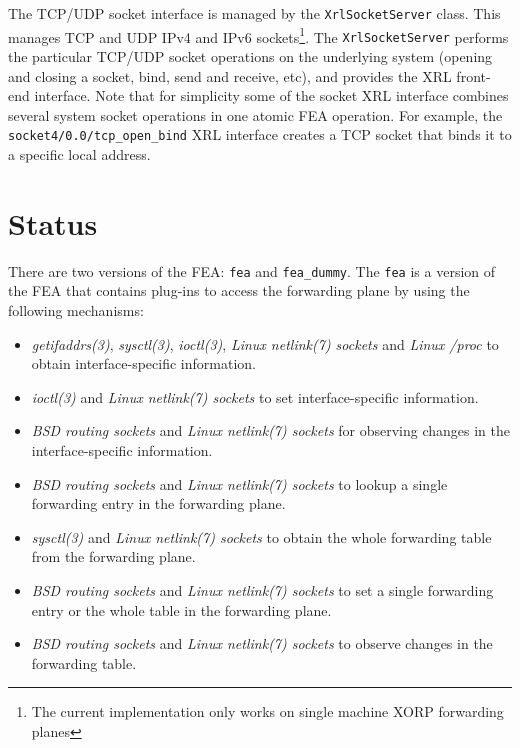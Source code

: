 \documentclass[11pt]{article}
\begin{document}
The TCP/UDP socket interface is managed by the {\tt XrlSocketServer}
class.  This manages TCP and UDP IPv4 and IPv6 sockets\footnote{The
current implementation only works on
single machine XORP forwarding planes}.  The {\tt XrlSocketServer}
performs the particular TCP/UDP socket operations on the underlying
system (opening and closing a socket, bind, send and receive, etc),
and provides the XRL front-end interface. Note that for simplicity
some of the socket XRL interface combines several system socket
operations in one atomic FEA operation. For example, the {\tt
  socket4/0.0/tcp\_open\_bind} XRL interface creates a TCP socket that
binds it to a specific local address.

\section{Status}
\label{sec:status}

There are two versions of the FEA: {\tt fea} and {\tt fea\_dummy}.
The {\tt fea} is a version
of the FEA that contains plug-ins to access the forwarding plane by
using the following mechanisms:

\begin{itemize}

  \item {\it getifaddrs(3)}, {\it sysctl(3)}, {\it ioctl(3)},
   {\it Linux netlink(7) sockets} and {\it Linux /proc} to obtain
   interface-specific information.

  \item {\it ioctl(3)} and {\it Linux netlink(7) sockets} to set
  interface-specific information.

  \item {\it BSD routing sockets} and {\it Linux netlink(7) sockets} for
  observing changes in the interface-specific information.

  \item {\it BSD routing sockets} and {\it Linux netlink(7) sockets} to lookup
  a single forwarding entry in the forwarding plane.

  \item {\it sysctl(3)} and {\it Linux netlink(7) sockets} to obtain the whole
  forwarding table from the forwarding plane.

  \item {\it BSD routing sockets} and {\it Linux netlink(7) sockets} to set a
  single forwarding entry or the whole table in the forwarding plane.

  \item {\it BSD routing sockets} and {\it Linux netlink(7) sockets} to
  observe changes in the forwarding table.

\end{itemize}
\end{document}
